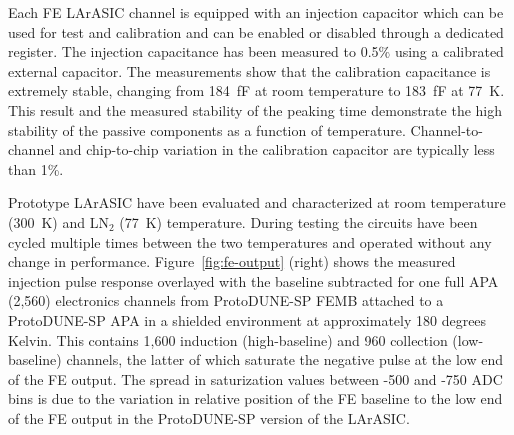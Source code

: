 Each FE LArASIC channel is equipped with an injection capacitor which can be used
for test and calibration and can be enabled or disabled through a
dedicated register. The injection capacitance has been measured to 0.5$\%$ using 
a calibrated external capacitor. The measurements show
that the calibration capacitance is extremely stable, changing from
184~fF at room temperature to 183~fF at 77~K. This result and the measured
stability of the peaking time demonstrate the high stability of the
passive components as a function of temperature. Channel-to-channel and chip-to-chip
variation in the calibration capacitor are typically less than 1\%. 

Prototype LArASIC have been evaluated and characterized at room temperature (300~K) and LN$_2$
(77~K) temperature.
During testing the circuits have been cycled multiple times
between the two temperatures and operated without any change in performance.
Figure~\ref{fig:fe-output} (right) shows the measured injection pulse response overlayed with the baseline subtracted for one full APA 
(2,560) electronics channels from ProtoDUNE-SP FEMB attached to a ProtoDUNE-SP APA in a 
shielded environment at approximately 180 degrees Kelvin. This contains 1,600 induction (high-baseline)
and 960 collection (low-baseline) channels, the latter of which saturate the negative pulse at the low 
end of the FE output. The spread in saturization values between -500 and -750 ADC bins is due to the
variation in relative position of the FE baseline to the low end of the FE output 
in the ProtoDUNE-SP version of the LArASIC.



